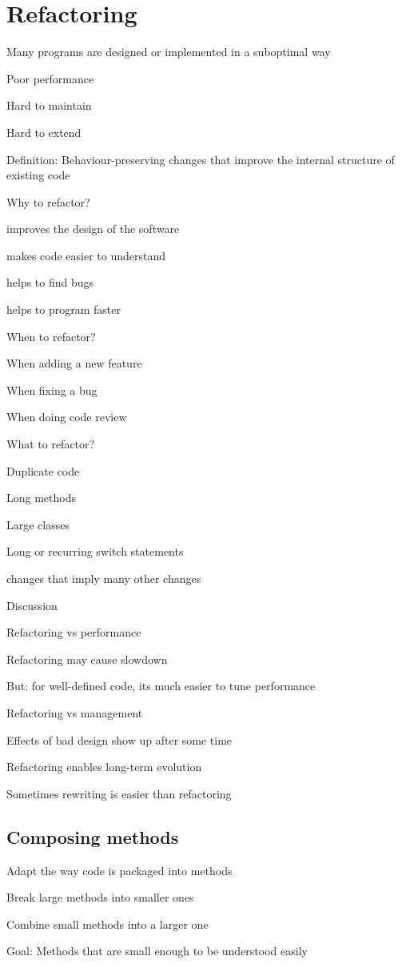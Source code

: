 \documentclass[10pt]{article}
\begin{document}
\section{Refactoring}
\enumstart
	\item Many programs are designed or implemented in a suboptimal way
	\enumstart
		\item Poor performance
		\item Hard to maintain
		\item Hard to extend
	\enumend
	\item Definition: Behaviour-preserving changes that improve the internal structure of existing code
	\item Why to refactor?
	\enumstart
		\item improves the design of the software
		\item makes code easier to understand
		\item helps to find bugs
		\item helps to program faster
	\enumend
	\item When to refactor?
	\enumstart
		\item When adding a new feature
		\item When fixing a bug
		\item When doing code review
	\enumend
	\item What to refactor?
	\enumstart
		\item Duplicate code
		\item Long methods
		\item Large classes
		\item Long or recurring switch statements
		\item changes that imply many other changes
	\enumend
	\item Discussion
	\enumstart
		\item Refactoring vs performance
		\enumstart
			\item Refactoring may cause slowdown
			\item But: for well-defined code, its much easier to tune performance
		\enumend
		\item Refactoring vs management
		\enumstart
			\item Effects of bad design show up after some time
			\item Refactoring enables long-term evolution
		\enumend
		\item Sometimes rewriting is easier than refactoring
	\enumend
\enumend

\subsection{Composing methods}
\enumstart
	\item Adapt the way code is packaged into methods
	\item Break large methods into smaller ones
	\item Combine small methods into a larger one
	\item Goal: Methods that are small enough to be understood easily
\enumend
\end{document}
